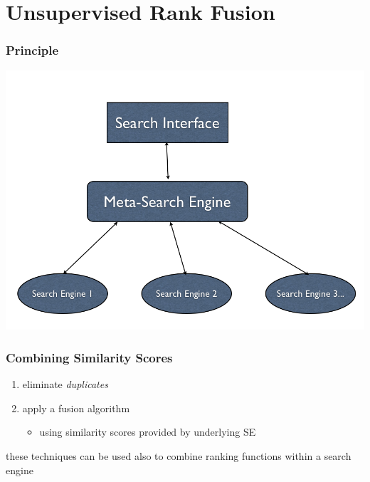 \documentclass{beamer}
\begin{document}
\section{Unsupervised Rank Fusion}

\begin{frame}
  \frametitle{Principle}

  \centering
  \includegraphics[width=0.8 \textwidth]{meta-search}

\end{frame}


\begin{frame}
    \frametitle{Combining Similarity Scores }

    \begin{enumerate}
    \item eliminate \emph{duplicates}
    \item apply a fusion algorithm
        \begin{itemize}
        \item using similarity scores provided by underlying SE
        \end{itemize}
    \end{enumerate}

    \begin{block}{}
        these techniques can be used also to combine ranking functions within
        a search engine
    \end{block}
\end{frame}
\end{document}
